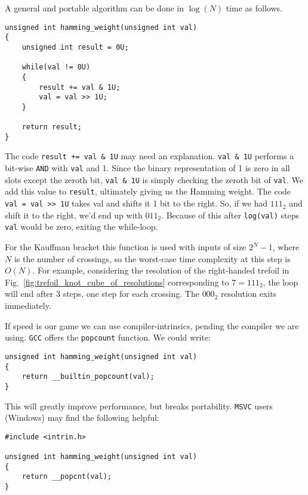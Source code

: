         A general and portable algorithm can be done in
        $\log(N)$ time as follows.
\begin{lstlisting}[style=CStyle]
unsigned int hamming_weight(unsigned int val)
{
    unsigned int result = 0U;

    while(val != 0U)
    {
        result += val & 1U;
        val = val >> 1U;
    }

    return result;
}
\end{lstlisting}
        The code \texttt{result += val \& 1U} may need an explanation.
        \texttt{val \& 1U} performs a bit-wise \texttt{AND} with \texttt{val} and
        1. Since the binary representation of 1 is zero in all slots except the
        zeroth bit, \texttt{val \& 1U} is simply checking the zeroth bit of
        \texttt{val}. We add this value to \texttt{result}, ultimately giving
        us the Hamming weight. The code \texttt{val = val >> 1U} takes val and
        shifts it 1 bit to the right. So, if we had $111_{2}$ and shift it to
        the right, we'd end up with $011_{2}$. Because of this after
        \texttt{log(val)} steps \texttt{val} would be zero, exiting the
        while-loop.
        \par\hfill\par
        For the Kauffman bracket this function is used with inputs of size
        $2^{N}-1$, where $N$ is the number of crossings, so the worst-case
        time complexity at this step is $O(N)$. For example, considering the
        resolution of the right-handed trefoil
        in Fig.~\ref{fig:trefoil_knot_cube_of_resolutions} corresponding to
        $7=111_{2}$, the loop will end after 3 steps, one step for each
        crossing. The $000_{2}$ resolution exits immediately.
        \par\hfill\par
        If speed is our game we can use compiler-intrinsics, pending the
        compiler we are using. \texttt{GCC} offers the \texttt{popcount}
        function. We could write:
\begin{lstlisting}[style=CStyle]
unsigned int hamming_weight(unsigned int val)
{
    return __builtin_popcount(val);
}
\end{lstlisting}
        This will greatly improve performance, but breaks portability.
        \texttt{MSVC} users (Windows) may find the following helpful:
\begin{lstlisting}[style=CStyle]
#include <intrin.h>

unsigned int hamming_weight(unsigned int val)
{
    return __popcnt(val);
}
\end{lstlisting}
